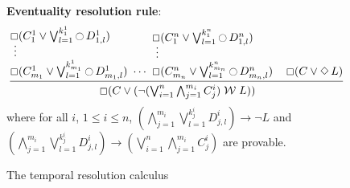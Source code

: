 \documentclass[11pt]{article}
\newcommand{\Negate}[0]{{\neg}}
\newcommand{\Next}[0]{\mathop{\ocircle}}
\newcommand{\Always}[0]{\mathop{\Box}}
\newcommand{\Sometimes}[0]{\mathop{\Diamond}}
\def\unless{\mathrel{\mathcal{W}}}
\newcommand{\WUntil}[0]{\unless}
\begin{document}
\begin{figure}[htb]
\textbf{Eventuality resolution rule}:
$$
\begin{array}[t]{@{}c@{}}
\begin{array}[b]{@{}l@{}}
\Always(C^1_1    \lor\bigvee_{l=1}^{k^1_1}{\Next D^1_{1,l}})\\[-1ex]
\ \vdots\\
\Always(C^1_{m_1}\lor\bigvee_{l=1}^{k^1_{m_1}}{\Next D^1_{m_1,l}})
\end{array}
\ \cdots\ 
\begin{array}[b]{@{}l@{}}
\Always(C^n_{1}  \lor\bigvee_{l=1}^{k^n_1}\Next D^n_{1,l})\\[-1ex]
\ \vdots\\
\Always(C^n_{m_n}\lor\bigvee_{l=1}^{k^n_{m_n}}\Next D^n_{m_n,l})
\end{array}
\quad
\Always(C\lor\Sometimes{L})\\[0.5ex]
\hline
\rule[0pt]{0pt}{2.6ex}\Always(C\lor 
(\Negate{(\bigvee_{i=1}^n \bigwedge_{j=1}^{m_i} C^i_j)}\WUntil L))
\end{array}
$$
where for all $i$, $1\leq i\leq n$,
$(\bigwedge_{j=1}^{m_i}\bigvee_{l=1}^{k^i_j} D^i_{j,l})\rightarrow \Negate L$ and
$(\bigwedge_{j=1}^{m_i}\bigvee_{l=1}^{k^i_j} D^i_{j,l})\rightarrow
(\bigvee_{i=1}^n\bigwedge_{j=1}^{m_i} C^i_j)$
are provable.
\caption{The temporal resolution calculus\label{trc}}
\end{figure}
\end{document}
